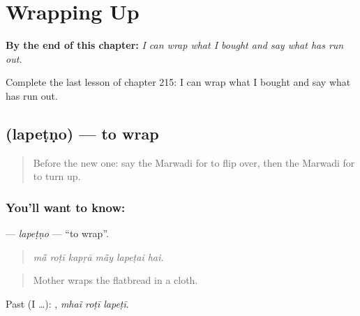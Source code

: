 
\chapter{Wrapping Up}
\label{ch:mw-wrapping-up}

\begin{chapteropening}
\textbf{By the end of this chapter:} \emph{I can wrap what I bought and say what has run out.}

Complete the last lesson of chapter 215: I can wrap what I bought and say what has run out.
\end{chapteropening}

\section[\texorpdfstring{\mw{लपेटणो} (lapeṭṇo)}{लपेटणो (lapeṭṇo)}]{ (lapeṭṇo) — to wrap}

\label{lesson:MW-C215-lapetno}



\begin{quote}
Before the new one: say the Marwadi for to flip over, then the Marwadi for to turn up.
\end{quote}

\subsection*{You'll want to know: }
\textbf{} — \emph{lapeṭṇo} — \textquotedblleft{}to wrap\textquotedblright{}.

\begin{quote}
     
\end{quote}

\begin{quote}
\emph{mā̃ roṭī kapṛā mā̃y lapeṭai hai.}
\end{quote}

\begin{quote}
Mother wraps the flatbread in a cloth.
\end{quote}

Past (I …):   , \emph{mhaĩ roṭī lapeṭī}.

